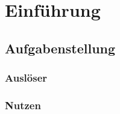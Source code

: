 
	\part{Einführung}
	
	\chapter{Aufgabenstellung}
	\label{cha:Aufgabenstellung}
	
	\section{Auslöser}
	
	
	\section{Nutzen}


